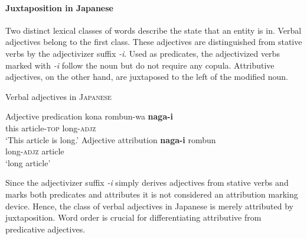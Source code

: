 \paragraph{Juxtaposition in Japanese}
Two distinct lexical classes of words describe the state that an entity is in. Verbal adjectives belong to the first class. These adjectives are distinguished from stative verbs by the adjectivizer suffix \textit{-i}. Used as predicates, the adjectivized verbs marked with \textit{-i} follow the noun but do not require any copula. Attributive adjectives, on the other hand, are juxtaposed to the left of the modified noun. 
\begin{exe}
\ex Verbal adjectives in \textsc{Japanese} \citep[170]{backhouse1984}
\begin{xlist}
\ex Adjective predication 
\gll	kona rombun-wa \textbf{naga-i}\\
	this article-\textsc{top} long-\textsc{adjz}\\%
\glt	‘This article is long.’
\ex Adjective attribution
\gll	\textbf{naga-i} rombun\\
	long-\textsc{adjz} article\\
\glt	‘long article’
\end{xlist}
\end{exe}
Since the adjectivizer suffix \textit{-i} simply derives adjectives from stative verbs and marks both predicates and attributes it is not considered an attribution marking device. Hence, the class of verbal adjectives in Japanese is merely attributed by juxtaposition. Word order is crucial for differentiating attributive from predicative adjectives. 

